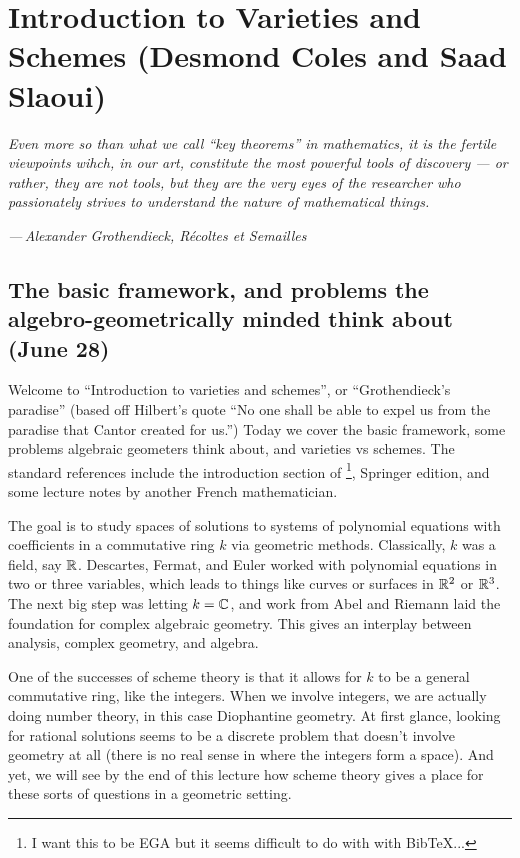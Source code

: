 \section{Introduction to Varieties and Schemes (Desmond Coles and Saad Slaoui)} 
\epigraph{\emph{Even more so than what we call ``key theorems'' in mathematics, it is the fertile viewpoints wihch, in our art, constitute the most powerful tools of discovery --- or rather, they are not tools, but they are the very eyes of the researcher who passionately strives to understand the nature of mathematical things.}}{\emph{—\,Alexander Grothendieck, R\'ecoltes et Semailles}}

\subsection{The basic framework, and problems the algebro-geometrically minded think about (June 28)}

Welcome to ``Introduction to varieties and schemes'', or ``Grothendieck's paradise'' (based off Hilbert's quote ``No one shall be able to expel us from the paradise that Cantor created for us.'') Today we cover the basic framework, some problems algebraic geometers think about, and varieties vs schemes. The standard references include the introduction section of \cite{ega}\footnote{I want this to be EGA but it seems difficult to do with with BibTeX...}, Springer edition, and some lecture notes by another French mathematician.

The goal is to study spaces of solutions to systems of polynomial equations with coefficients in a commutative ring $k$ via geometric methods. Classically, $k$ was a field, say $\mathbb{R}$. Descartes, Fermat, and Euler worked with polynomial equations in two or three variables, which leads to things like curves or surfaces in $\mathbb{R}^2$ or $\mathbb{R}^3$. The next big step was letting $k=\mathbb{C}$, and work from Abel and Riemann laid the foundation for complex algebraic geometry. This gives an interplay between analysis, complex geometry, and algebra.

One of the successes of scheme theory is that it allows for $k$ to be a general commutative ring, like the integers. When we involve integers, we are actually doing number theory, in this case Diophantine geometry. At first glance, looking for rational solutions seems to be a discrete problem that doesn't involve geometry at all (there is no real sense in where the integers form a space). And yet, we will see by the end of this lecture how scheme theory gives a place for these sorts of questions in a geometric setting.

